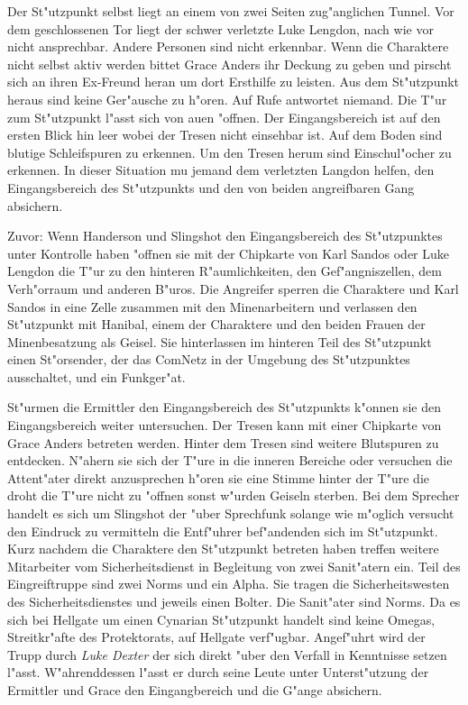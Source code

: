 Der St"utzpunkt selbst liegt an einem von zwei Seiten zug"anglichen Tunnel. Vor dem geschlossenen Tor liegt der schwer verletzte Luke Lengdon, nach wie vor nicht ansprechbar. Andere Personen sind nicht erkennbar. Wenn die Charaktere nicht selbst aktiv werden bittet Grace Anders ihr Deckung zu geben und pirscht sich an ihren Ex-Freund heran um dort Ersthilfe zu leisten. Aus dem St"utzpunkt heraus sind keine Ger"ausche zu h"oren. Auf Rufe antwortet niemand. Die T"ur zum St"utzpunkt l"asst sich von au\3en "offnen. Der Eingangsbereich ist auf den ersten Blick hin leer wobei der Tresen nicht einsehbar ist. Auf dem Boden sind blutige Schleifspuren zu erkennen. Um den Tresen herum sind Einschu\3l"ocher zu erkennen. In dieser Situation mu\3 jemand dem verletzten Langdon helfen, den Eingangsbereich des St"utzpunkts und den von beiden angreifbaren Gang absichern. 


Zuvor: Wenn Handerson und Slingshot den Eingangsbereich des St"utzpunktes unter Kontrolle haben "offnen sie mit der Chipkarte von Karl Sandos oder Luke Lengdon die T"ur zu den hinteren R"aumlichkeiten, den Gef"angniszellen, dem Verh"orraum und anderen B"uros. Die Angreifer sperren die Charaktere und Karl Sandos in eine Zelle zusammen mit den Minenarbeitern und verlassen den St"utzpunkt mit Hanibal, einem der Charaktere und den beiden Frauen der Minenbesatzung als Geisel. Sie hinterlassen im hinteren Teil des St"utzpunkt einen St"orsender, der das ComNetz in der Umgebung des St"utzpunktes ausschaltet, und ein Funkger"at.  

St"urmen die Ermittler den Eingangsbereich des St"utzpunkts k"onnen sie den Eingangsbereich weiter untersuchen. Der Tresen kann mit einer Chipkarte von Grace Anders betreten werden. Hinter dem Tresen sind weitere Blutspuren zu entdecken. N"ahern sie sich der T"ure in die inneren Bereiche oder versuchen die Attent"ater direkt anzusprechen h"oren sie eine Stimme hinter der T"ure die droht die T"ure nicht zu "offnen sonst w"urden Geiseln sterben. Bei dem Sprecher handelt es sich um Slingshot der "uber Sprechfunk solange wie m"oglich versucht den Eindruck zu vermitteln die Entf"uhrer bef"andenden sich im St"utzpunkt. Kurz nachdem die Charaktere den St"utzpunkt betreten haben treffen  weitere Mitarbeiter vom Sicherheitsdienst in Begleitung von zwei Sanit"atern ein. Teil des Eingreiftruppe sind zwei Norms und ein Alpha. Sie tragen die Sicherheitswesten des Sicherheitsdienstes und jeweils einen Bolter. Die Sanit"ater sind Norms. Da es sich bei Hellgate um einen Cynarian St"utzpunkt handelt sind keine Omegas, Streitkr"afte des Protektorats, auf Hellgate verf"ugbar. Angef"uhrt wird der Trupp durch \emph{Luke Dexter} der sich direkt "uber den Verfall in Kenntnisse setzen l"asst. W"ahrenddessen l"asst er durch seine Leute unter Unterst"utzung der Ermittler und Grace den Eingangbereich und die G"ange absichern. 


